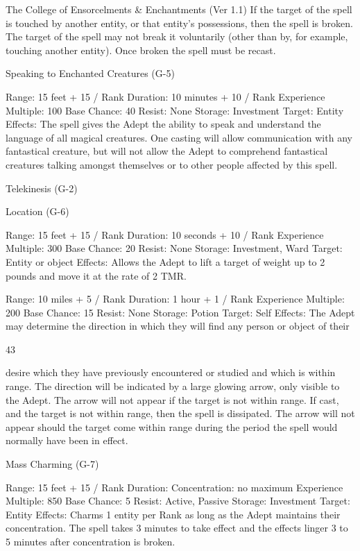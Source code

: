 \begin{Chapter}{The College of Ensorcelments \& Enchantments (Ver 1.1)}
If  the  target  of  the  spell  is  touched  by  another 
entity, or that entity’s possessions, then the spell is 
broken.  The  target  of  the  spell  may  not  break  it 
voluntarily  (other  than  by,  for  example,  touching 
another  entity).  Once  broken  the  spell  must  be 
recast. 

Speaking to Enchanted Creatures (G-5) 

Range: 15 feet + 15 / Rank 
Duration: 10 minutes + 10 / Rank 
Experience Multiple: 100 
Base Chance: 40%
Resist: None 
Storage: Investment 
Target: Entity 
Effects:  The  spell  gives  the  Adept  the  ability  to 
speak  and  understand  the  language  of  all  magical 
creatures.  One  casting  will  allow  communication 
with any fantastical creature, but will not allow the 
Adept  to  comprehend  fantastical  creatures  talking 
amongst themselves or to other people affected by 
this spell. 

Telekinesis (G-2) 

Location (G-6) 

Range: 15 feet + 15 / Rank 
Duration: 10 seconds + 10 / Rank 
Experience Multiple: 300 
Base Chance: 20%
Resist: None 
Storage: Investment, Ward 
Target: Entity or object 
Effects: Allows the Adept to lift a target of weight 
up  to 2 pounds  and  move  it  at the  rate  of  2  TMR. 

Range: 10 miles + 5 / Rank 
Duration: 1 hour + 1 / Rank 
Experience Multiple: 200 
Base Chance: 15%
Resist: None 
Storage: Potion 
Target: Self 
Effects: The  Adept may determine the direction in 
which  they  will  find  any  person  or  object  of  their 

43 

desire  which  they  have  previously  encountered  or 
studied  and  which  is  within  range.  The  direction 
will  be  indicated  by  a  large  glowing  arrow,  only 
visible  to  the  Adept.  The  arrow  will  not  appear  if 
the target is not within range. If cast, and the target 
is not within range, then the spell is dissipated. The 
arrow  will  not  appear  should  the  target  come 
within  range  during  the  period  the  spell  would 
normally have been in effect. 

Mass Charming (G-7) 

Range: 15 feet + 15 / Rank 
Duration: Concentration: no maximum 
Experience Multiple: 850 
Base Chance: 5%
Resist: Active, Passive 
Storage: Investment 
Target: Entity 
Effects:  Charms  1  entity  per  Rank  as  long  as  the 
Adept  maintains  their  concentration.  The  spell 
takes 3 minutes to take effect and the effects linger 
3 to 5 minutes after concentration is broken. 


\end{Chapter}
